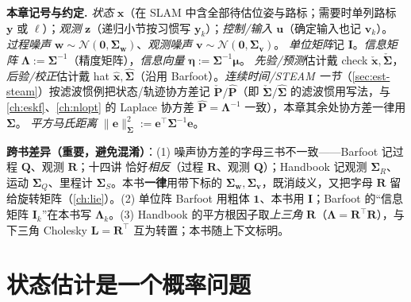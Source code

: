 \begin{note}
\textbf{本章记号与约定.}\;
\emph{状态} $\mathbf{x}$（在 SLAM 中含全部待估位姿与路标；需要时单列路标 $\mathbf{y}$ 或 $\boldsymbol{\ell}$）；\emph{观测} $\mathbf{z}$（递归小节按习惯写 $\mathbf{y}_k$）；\emph{控制/输入} $\mathbf{u}$（确定输入也记 $\mathbf{v}_k$）。
\emph{过程噪声} $\mathbf{w}\sim\mathcal{N}(\mathbf{0},\boldsymbol{\Sigma}_{\mathbf{w}})$、\emph{观测噪声} $\mathbf{v}\sim\mathcal{N}(\mathbf{0},\boldsymbol{\Sigma}_{\mathbf{v}})$。
\emph{单位矩阵}记 $\mathbf{I}$。\emph{信息矩阵} $\boldsymbol{\Lambda}:=\boldsymbol{\Sigma}^{-1}$（精度矩阵），\emph{信息向量} $\boldsymbol{\eta}:=\boldsymbol{\Sigma}^{-1}\boldsymbol{\mu}$。
\emph{先验/预测}估计戴 check $\check{\mathbf{x}},\check{\boldsymbol{\Sigma}}$，\emph{后验/校正}估计戴 hat $\hat{\mathbf{x}},\hat{\boldsymbol{\Sigma}}$（沿用 Barfoot\cite{barfoot2024state}）。\emph{连续时间/STEAM 一节}（\cref{sec:est-steam}）按滤波惯例把状态/轨迹协方差记 $\check{\mathbf{P}}/\hat{\mathbf{P}}$（即 $\check{\boldsymbol{\Sigma}}/\hat{\boldsymbol{\Sigma}}$ 的滤波惯用写法，与 \cref{ch:eskf}、\cref{ch:nlopt} 的 Laplace 协方差 $\hat{\mathbf{P}}=\boldsymbol{\Lambda}^{-1}$ 一致），本章其余处协方差一律用 $\boldsymbol{\Sigma}$。
\emph{平方马氏距离} $\|\mathbf{e}\|_{\boldsymbol{\Sigma}}^2:=\mathbf{e}^\top\boldsymbol{\Sigma}^{-1}\mathbf{e}$。

\textbf{跨书差异（重要，避免混淆）}：(1) 噪声协方差的字母三书不一致——Barfoot\cite{barfoot2024state} 记过程 $\mathbf{Q}$、观测 $\mathbf{R}$；十四讲\cite{gaoxiang2019slam14} 恰好\emph{相反}（过程 $\mathbf{R}$、观测 $\mathbf{Q}$）；Handbook\cite{carlone2026handbook} 记观测 $\boldsymbol{\Sigma}_R$、运动 $\boldsymbol{\Sigma}_Q$、里程计 $\boldsymbol{\Sigma}_S$。本书\textbf{一律}用带下标的 $\boldsymbol{\Sigma}_{\mathbf{w}},\boldsymbol{\Sigma}_{\mathbf{v}}$，既消歧义，又把字母 $\mathbf{R}$ 留给旋转矩阵（\cref{ch:lie}）。(2) 单位阵 Barfoot 用粗体 $\mathbf{1}$、本书用 $\mathbf{I}$；Barfoot 的“信息矩阵 $\mathbf{I}_k$”在本书写 $\boldsymbol{\Lambda}_k$。(3) Handbook 的平方根因子取\emph{上三角} $\mathbf{R}$（$\boldsymbol{\Lambda}=\mathbf{R}^\top\mathbf{R}$），与下三角 Cholesky $\mathbf{L}=\mathbf{R}^\top$ 互为转置；本书随上下文标明。
\end{note}

\section{状态估计是一个概率问题}
\label{sec:est-why}

